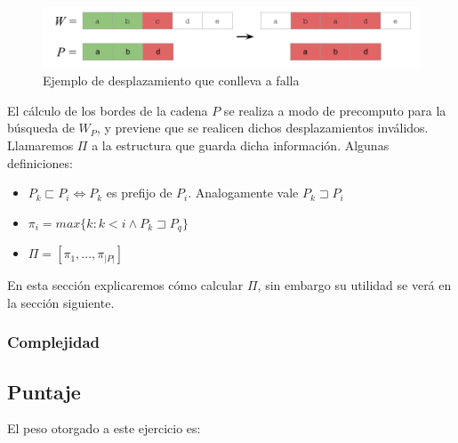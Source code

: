 \begin{figure}[H]
	\centering
	\includegraphics[width=\textwidth]{Imagenes/Ejercicio1/ShiftInvalido.png}
	\caption{Ejemplo de desplazamiento que conlleva a falla}
\end{figure}

El cálculo de los bordes de la cadena $P$ se realiza a modo de precomputo para la búsqueda de $W_P$, y previene que se realicen dichos desplazamientos inválidos. Llamaremos $\Pi$ a la estructura que guarda dicha información.
Algunas definiciones:
\begin{itemize}
	\item $P_k \sqsubset P_i \Leftrightarrow P_k$ es prefijo de $P_i$. Analogamente vale $P_k \sqsupset P_i$
	\item $\pi_i = max \{k: k < i \wedge P_k \sqsupset P_q\}$
	\item $\Pi = [\pi_1,...,\pi_{|P|}]$
\end{itemize}

En esta sección explicaremos cómo calcular $\Pi$, sin embargo su utilidad se verá en la sección siguiente.

\subsubsection{Complejidad}

\subsection{Puntaje}
El peso otorgado a este ejercicio es:
